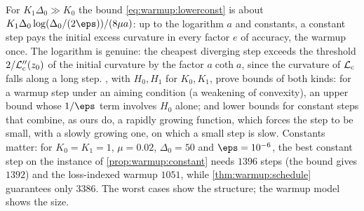 \begin{refsection}
For $K_1\Delta_0\gg K_0$ the bound \eqref{eq:warmup:lowerconst} is about $K_1\Delta_0\log(\Delta_0/(2\eps))/(8\mu a)$: up to the logarithm $a$ and constants, a constant step pays the initial excess curvature in every factor $e$ of accuracy, the warmup once. The logarithm is genuine: the cheapest diverging step exceeds the threshold $2/\mathcal{L}_{\mathrm c}''(z_0)$ of the initial curvature by the factor $a\coth a$, since the curvature of $\mathcal{L}_{\mathrm c}$ falls along a long step. \Textcite{AlimisisIslamovLucchi2026}, with $H_0,H_1$ for $K_0,K_1$, prove bounds of both kinds: for a warmup step under an aiming condition (a weakening of convexity), an upper bound whose $1/\eps$ term involves $H_0$ alone; and lower bounds for constant steps that combine, as ours do, a rapidly growing function, which forces the step to be small, with a slowly growing one, on which a small step is slow. Constants matter: for $K_0=K_1=1$, $\mu=0.02$, $\Delta_0=50$ and $\eps=10^{-6}$, the best constant step on the instance of \cref{prop:warmup:constant} needs $1396$ steps (the bound gives $1392$) and the loss-indexed warmup $1051$, while \cref{thm:warmup:schedule} guarantees only $3386$. The worst cases show the structure; the warmup model shows the size.



\end{refsection}
